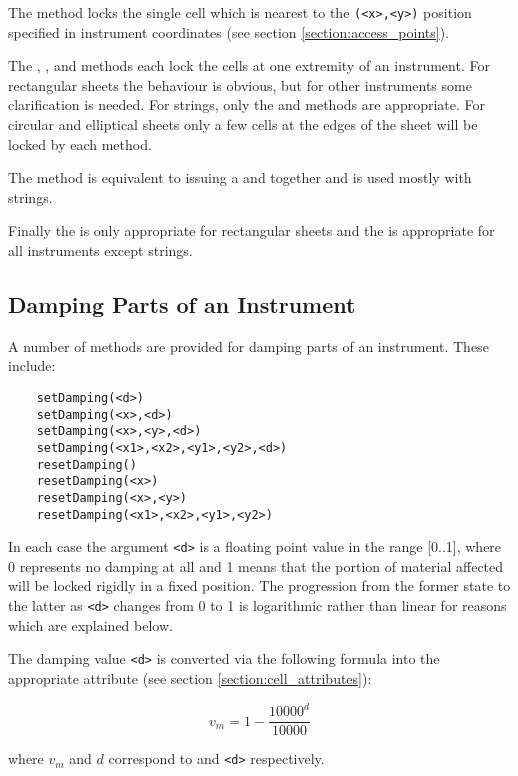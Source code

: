 The  method locks the single cell which is nearest
to the \verb|(<x>,<y>)| position specified in instrument coordinates
(see section \ref{section:access_points}).

The , , 
and  methods each lock the cells at one extremity
of an instrument. For rectangular sheets the behaviour is obvious, but
for other instruments some clarification is needed. For strings, only the
 and  methods are appropriate. For
circular and elliptical sheets only a few cells at the edges of the sheet
will be locked by each method.

The  method is equivalent to issuing a 
and  together and is used mostly with strings.

Finally the  is only appropriate for rectangular
sheets and the  is appropriate for all
instruments except strings.

\subsection{Damping Parts of an Instrument}
A number of methods are provided for damping parts of an instrument.
These include:

\begin{verbatim}
    setDamping(<d>)
    setDamping(<x>,<d>)
    setDamping(<x>,<y>,<d>)
    setDamping(<x1>,<x2>,<y1>,<y2>,<d>)
    resetDamping()
    resetDamping(<x>)
    resetDamping(<x>,<y>)
    resetDamping(<x1>,<x2>,<y1>,<y2>)
\end{verbatim}

In each case the argument \verb|<d>| is a floating point value in
the range [0..1], where 0 represents no damping at all and 1 means that
the portion of material affected will be locked rigidly in a fixed
position. The progression from the former state to the latter as
\verb|<d>| changes from 0 to 1 is logarithmic rather than linear
for reasons which are explained below.

The damping value \verb|<d>| is converted via the following formula
into the appropriate  attribute (see section
\ref{section:cell_attributes}):

\[ v_{m} = 1 - \frac{10000^{d}}{10000} \]

where $v_{m}$ and $d$ correspond to  and
\verb|<d>| respectively.

